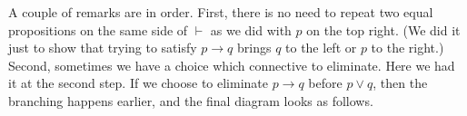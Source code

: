 A couple of remarks are in order.
First, there is no need to repeat two equal propositions on the same side of $\vdash$ as we did with $p$ on the top right.
(We did it just to show that trying to satisfy $p \to q$ brings $q$ to the left or $p$ to the right.)
Second, sometimes we have a choice which connective to eliminate.
Here we had it at the second step.
If we choose to eliminate $p \to q$ before $p \vee q$, then the branching happens earlier, and the final diagram looks as follows.
\begin{prooftree}
\end{prooftree}


